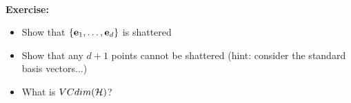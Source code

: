 ~\\{\bf Exercise:}
\begin{itemize}
\item Show that $\{{\mathbf e}_1,\ldots,{\mathbf e}_d\}$ is shattered
\item Show that any $d+1$ points cannot be shattered (hint: consider the standard basis vectors...)
\item What is $VCdim(\mathcal{H})$?
\end{itemize}




